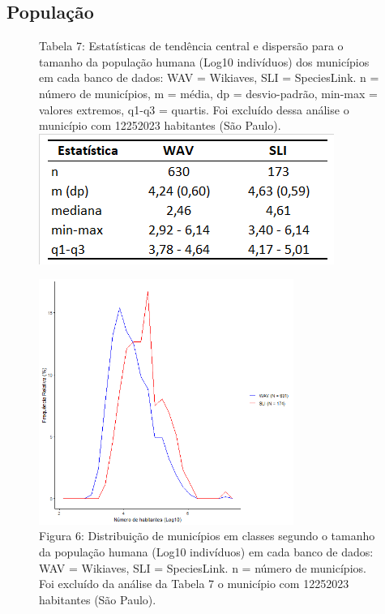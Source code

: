 \newpage

\subsection{População}

\begin{figure}[h!]
\centering
{\scriptsize Tabela 7: Estatísticas de tendência central e dispersão para o tamanho da população humana (Log10 indivíduos) dos municípios em cada banco de dados: WAV = Wikiaves, SLI = SpeciesLink. n = número de municípios, m = média, dp = desvio-padrão, min-max = valores extremos, q1-q3 = quartis. Foi excluído dessa análise o município com 12252023 habitantes (São Paulo).}
\\
\includegraphics{Tabelas/7.png}
\end{figure}

\texto

\begin{figure}[h!]
\centering
\includegraphics[height = 8cm]{Imagens/233.png}
\\{\scriptsize Figura 6: Distribuição de municípios em classes segundo o tamanho da população humana (Log10 indivíduos) em cada banco de dados: WAV = Wikiaves, SLI = SpeciesLink. n = número de municípios. Foi excluído da análise da Tabela 7 o município com 12252023 habitantes (São Paulo).}
\end{figure}

